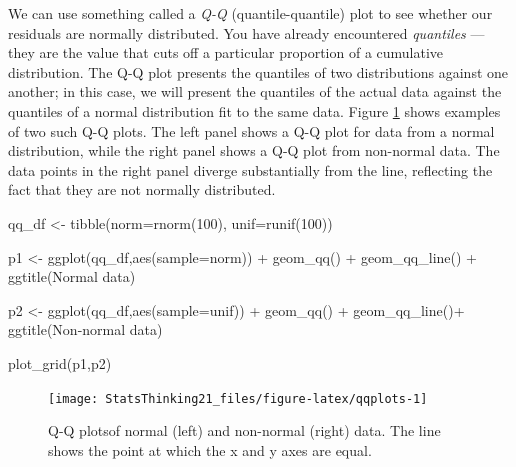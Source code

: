 \documentclass[
  12pt,
]{book}
\newenvironment{Shaded}{\begin{snugshade}}{\end{snugshade}}
\newcommand{\AttributeTok}[1]{\textcolor[rgb]{0.77,0.63,0.00}{#1}}
\newcommand{\DecValTok}[1]{\textcolor[rgb]{0.00,0.00,0.81}{#1}}
\newcommand{\FunctionTok}[1]{\textcolor[rgb]{0.00,0.00,0.00}{#1}}
\newcommand{\NormalTok}[1]{#1}
\newcommand{\OtherTok}[1]{\textcolor[rgb]{0.56,0.35,0.01}{#1}}
\newcommand{\SpecialCharTok}[1]{\textcolor[rgb]{0.00,0.00,0.00}{#1}}
\newcommand{\StringTok}[1]{\textcolor[rgb]{0.31,0.60,0.02}{#1}}
\begin{document}
We can use something called a \emph{Q-Q} (quantile-quantile) plot to see whether our residuals are normally distributed. You have already encountered \emph{quantiles} --- they are the value that cuts off a particular proportion of a cumulative distribution. The Q-Q plot presents the quantiles of two distributions against one another; in this case, we will present the quantiles of the actual data against the quantiles of a normal distribution fit to the same data. Figure \ref{fig:qqplots} shows examples of two such Q-Q plots. The left panel shows a Q-Q plot for data from a normal distribution, while the right panel shows a Q-Q plot from non-normal data. The data points in the right panel diverge substantially from the line, reflecting the fact that they are not normally distributed.

\begin{Shaded}
\begin{Highlighting}[]
\NormalTok{qq\_df }\OtherTok{\textless{}{-}} \FunctionTok{tibble}\NormalTok{(}\AttributeTok{norm=}\FunctionTok{rnorm}\NormalTok{(}\DecValTok{100}\NormalTok{),}
                \AttributeTok{unif=}\FunctionTok{runif}\NormalTok{(}\DecValTok{100}\NormalTok{))}

\NormalTok{p1 }\OtherTok{\textless{}{-}} \FunctionTok{ggplot}\NormalTok{(qq\_df,}\FunctionTok{aes}\NormalTok{(}\AttributeTok{sample=}\NormalTok{norm)) }\SpecialCharTok{+} 
  \FunctionTok{geom\_qq}\NormalTok{() }\SpecialCharTok{+} 
  \FunctionTok{geom\_qq\_line}\NormalTok{() }\SpecialCharTok{+} 
  \FunctionTok{ggtitle}\NormalTok{(}\StringTok{\textquotesingle{}Normal data\textquotesingle{}}\NormalTok{)}

\NormalTok{p2 }\OtherTok{\textless{}{-}} \FunctionTok{ggplot}\NormalTok{(qq\_df,}\FunctionTok{aes}\NormalTok{(}\AttributeTok{sample=}\NormalTok{unif)) }\SpecialCharTok{+} 
  \FunctionTok{geom\_qq}\NormalTok{() }\SpecialCharTok{+} 
  \FunctionTok{geom\_qq\_line}\NormalTok{()}\SpecialCharTok{+} 
  \FunctionTok{ggtitle}\NormalTok{(}\StringTok{\textquotesingle{}Non{-}normal data\textquotesingle{}}\NormalTok{)}

\FunctionTok{plot\_grid}\NormalTok{(p1,p2)}
\end{Highlighting}
\end{Shaded}

\begin{figure}
\texttt{[image: StatsThinking21\_files/figure-latex/qqplots-1]} \caption{Q-Q plotsof normal (left) and non-normal (right) data.  The line shows the point at which the x and y axes are equal.}\label{fig:qqplots}
\end{figure}
\end{document}

